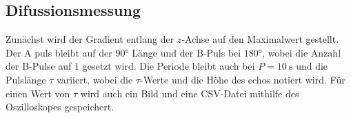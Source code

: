 \subsection{Difussionsmessung}
Zunächst wird der Gradient entlang der $z$-Achse auf den Maximalwert gestellt. 
Der A puls bleibt auf der $90°$ Länge und der B-Puls bei $180°$, wobei die Anzahl der B-Pulse auf $1$ gesetzt wird.
Die Periode bleibt auch bei $ P = \SI{10}{\second}$ und die Pulslänge $\tau$ variiert, wobei die $\tau$-Werte und die Höhe des echos notiert wird.
Für einen Wert von $\tau$ wird auch ein Bild und eine CSV-Datei mithilfe des Oszilloskopes gespeichert.